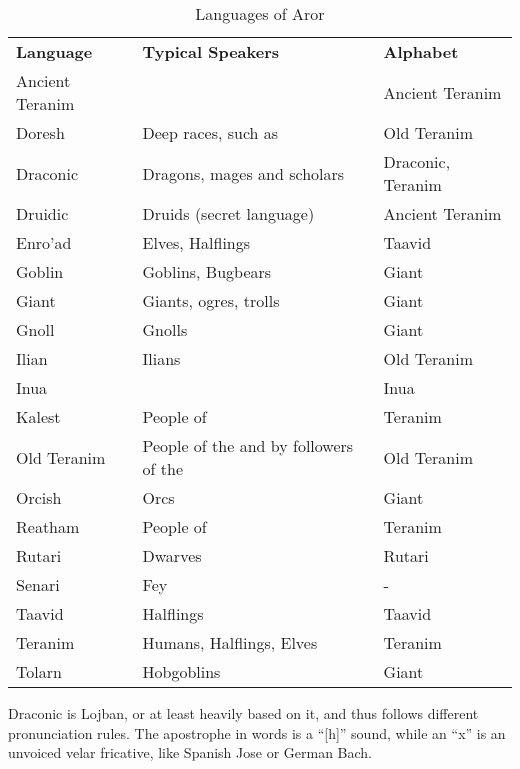 \begin{table*}[!htb]
  \caption{Languages of Aror} \label{tbl:Languages}
  \begin{tabular}{l p{8cm} l}
    \textbf{Language} & \textbf{Typical Speakers} & \textbf{Alphabet} \\
    Ancient Teranim & \nameref{sec:Tynrikke}      & Ancient Teranim \\
    Doresh          & Deep races, such as \nameref{sec:Deepkin} & Old Teranim \\
    Draconic        & Dragons, mages and scholars & Draconic, Teranim \\
    Druidic         & Druids (secret language)    & Ancient Teranim \\
    Enro'ad         & Elves, Halflings            & Taavid \\
    Goblin          & Goblins, Bugbears           & Giant \\
    Giant           & Giants, ogres, trolls       & Giant \\
    Gnoll           & Gnolls                      & Giant \\
    Ilian           & Ilians                      & Old Teranim \\
    Inua            & \nameref{sec:Inua}          & Inua \\
    Kalest          & People of \nameref{sec:Arania} & Teranim \\
    Old Teranim     & People of the \nameref{sec:Dirgewood} and by followers of the \nameref{sec:Old Ways} & Old Teranim \\
    Orcish          & Orcs                        & Giant \\
    Reatham         & People of \nameref{sec:Forsby} & Teranim \\
    Rutari          & Dwarves                     & Rutari \\
    Senari          & Fey                         & - \\
    Taavid          & Halflings                   & Taavid \\
    Teranim         & Humans, Halflings, Elves    & Teranim \\
    Tolarn          & Hobgoblins                  & Giant \\
  \end{tabular}
\end{table*}

\begin{note}
  Draconic is Lojban, or at least heavily based on it, and thus follows
  different pronunciation rules. The apostrophe in words is a ``[h]'' sound,
  while an ``x'' is an unvoiced velar fricative, like Spanish Jose or German
  Bach.
\end{note}

